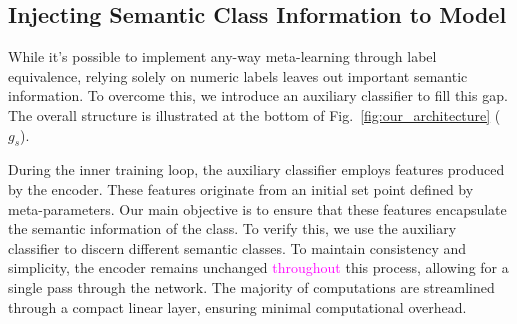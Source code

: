 \documentclass[letterpaper]{article} %
\newcommand{\nj}[1]{\textcolor{red}{#1}}
\newcommand{\yr}[1]{\textcolor{magenta}{#1}}
\begin{document}
\subsection{Injecting Semantic Class Information to Model}
While it's possible to
implement any-way meta-learning through label equivalence, relying solely on numeric labels leaves out important semantic information. To overcome this, we introduce an auxiliary classifier to fill this gap.
The overall structure is illustrated at the bottom of Fig.~\ref{fig:our_architecture} ($g_s$).

During the inner training loop, the auxiliary classifier employs features produced by the encoder. These features originate from an initial set point defined by meta-parameters. Our main objective is to ensure that these features encapsulate %
the semantic information of the class. To verify this, we use the auxiliary classifier to discern different semantic classes. To maintain %
consistency and simplicity, the encoder remains unchanged \yr{throughout} this process, allowing for a single pass through the network. The majority of computations are streamlined through a compact linear layer, ensuring minimal computational overhead.
\end{document}
